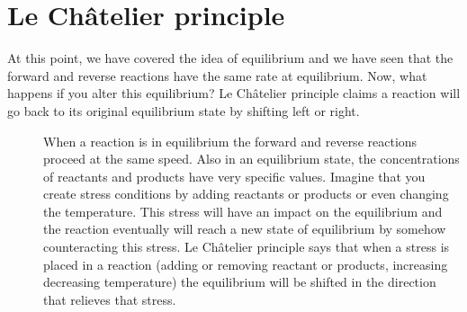 \documentclass[main.tex]{subfiles}
\begin{document}
\section{ {Le Ch\^{a}telier principle}}
At this point, we have covered the idea of equilibrium and we have seen that the forward and reverse reactions have the same rate at equilibrium. Now, what happens if you alter this equilibrium? Le Ch\^{a}telier principle claims a reaction will go back to its original equilibrium state by shifting left or right.
\sloppy
\begin{description}
\item[] 
When a reaction is in equilibrium the forward and reverse reactions proceed at the same speed. Also in an equilibrium state, the concentrations of reactants and products have very specific values. Imagine that you create stress conditions by adding reactants or products or even changing the temperature. This stress will have an impact on the equilibrium and the reaction eventually will reach a new state of equilibrium by somehow counteracting this stress.
 Le Ch\^{a}telier principle says that when a stress is placed in a reaction (adding or removing reactant or products, increasing decreasing temperature) the equilibrium will be shifted in the direction that relieves that stress. 
 

\end{description}
\end{document}
